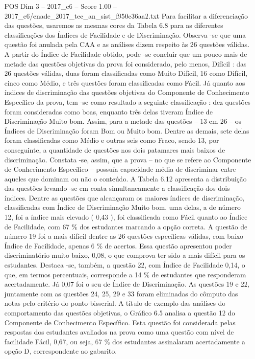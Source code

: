 \begin{textsample}{POS Dim 3 – 2017\_c6 – Score 1.00 – 2017\_c6/enade\_2017\_tec\_an\_sist\_f950c36aa2.txt}
Para facilitar a diferenciação das questões, usaremos as mesmas cores da Tabela 6.8 para as diferentes classificações dos Índices de Facilidade e de Discriminação.
Observa -se que uma questão foi anulada pela CAA e as análises dizem respeito às 26 questões válidas.
A partir do Índice de Facilidade obtido, pode -se concluir que um pouco mais de metade das questões objetivas da prova foi considerado, pelo menos, Difícil : das 26 questões válidas, duas foram classificadas como Muito Difícil, 16 como Difícil, cinco como Médio, e três questões foram classificadas como Fácil.
Já quanto aos índices de discriminação das questões objetivas do Componente de Conhecimento Específico da prova, tem -se como resultado a seguinte classificação : dez questões foram consideradas como boas, enquanto três delas tiveram Índice de Discriminação Muito bom.
Assim, para a metade das questões – 13 em 26 – os Índices de Discriminação foram Bom ou Muito bom.
Dentre as demais, sete delas foram classificadas como Médio e outras seis como Fraco, sendo 13, por conseguinte, a quantidade de questões nos dois patamares mais baixos de discriminação.
Constata -se, assim, que a prova – no que se refere ao Componente de Conhecimento Específico – possuía capacidade média de discriminar entre aqueles que dominam ou não o conteúdo.
A Tabela 6.12 apresenta a distribuição das questões levando -se em conta simultaneamente a classificação dos dois índices.
Dentre as questões que alcançaram os maiores índices de discriminação, classificadas com Índice de Discriminação Muito bom, uma delas, a de número 12, foi a índice mais elevado ( 0,43 ), foi classificada como Fácil quanto ao Índice de Facilidade, com 67 \% dos estudantes marcando a opção correta.
A questão de número 19 foi a mais difícil dentre as 26 questões específicas válidas, com baixo Índice de Facilidade, apenas 6 \% de acertos.
Essa questão apresentou poder discriminatório muito baixo, 0,08, o que comprova ter sido a mais difícil para os estudantes.
Destaca -se, também, a questão 22, com Índice de Facilidade 0,14, o que, em termos percentuais, corresponde a 14 \% de estudantes que responderam acertadamente.
Já 0,07 foi o seu de Índice de Discriminação.
As questões 19 e 22, juntamente com as questões 24, 25, 29 e 33 foram eliminadas do cômputo das notas pelo critério do ponto-bisserial.
A título de exemplo das análises do comportamento das questões objetivas, o Gráfico 6.5 analisa a questão 12 do Componente de Conhecimento Específico.
Esta questão foi considerada pelas respostas dos estudantes avaliados na prova como uma questão com nível de facilidade Fácil, 0,67, ou seja, 67 \% dos estudantes assinalaram acertadamente a opção D, correspondente ao gabarito.

\end{textsample}
